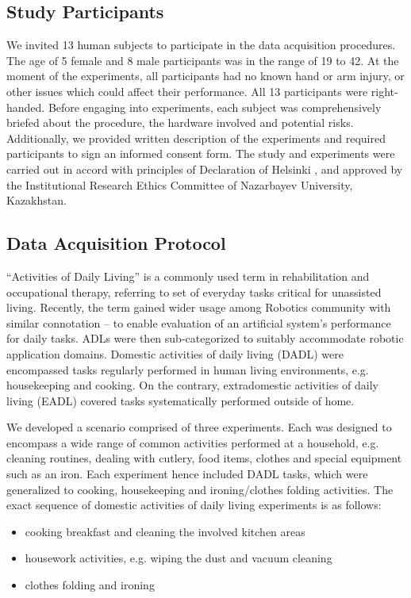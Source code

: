 \documentclass[journal]{IEEEtran}
\begin{document}
\subsection{Study Participants}
We invited 13 human subjects to participate in the data acquisition procedures. The age of 5 female and 8 male participants was in the range of 19 to 42. At the moment of the experiments, all participants had no known hand or arm injury, or other issues which could affect their performance. All 13 participants were right-handed. Before engaging into experiments, each subject was comprehensively briefed about the procedure, the hardware involved and potential risks. Additionally, we provided written description of the experiments and required participants to sign an informed consent form. The study and experiments were carried out in accord with principles of Declaration of Helsinki \cite{IEEEhowto: Declaration of Helsinki}, and approved by the Institutional Research Ethics Committee of Nazarbayev University, Kazakhstan.

\subsection{Data Acquisition Protocol}

“Activities of Daily Living” is a commonly used term in rehabilitation and occupational therapy, referring to set of everyday tasks critical for unassisted living. Recently, the term gained wider usage among Robotics community with similar connotation – to enable evaluation of an artificial system’s performance for daily tasks. ADLs were then sub-categorized to suitably accommodate robotic application domains. Domestic activities of daily living (DADL) were encompassed tasks regularly performed in human living environments, e.g. housekeeping and cooking. On the contrary, extradomestic activities of daily living (EADL) covered tasks systematically performed outside of home. 

We developed a scenario comprised of three experiments. Each was designed to encompass a wide range of common activities performed at a household, e.g. cleaning routines, dealing with cutlery, food items, clothes and special equipment such as an iron. Each experiment hence included DADL tasks, which were generalized to cooking, housekeeping and ironing/clothes folding activities. The exact sequence of domestic activities of daily living experiments is as follows:

\begin{itemize}
  \item cooking breakfast and cleaning the involved kitchen areas
  \item housework activities, e.g. wiping the dust and vacuum cleaning
  \item clothes folding and ironing
\end{itemize}
\end{document}
